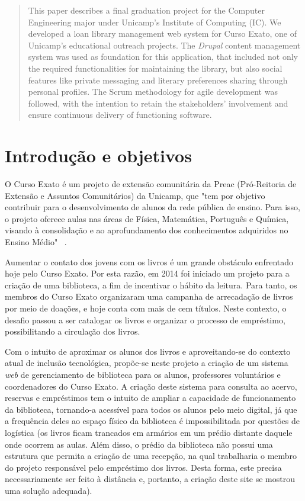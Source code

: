 \documentclass[a4paper]{article}
\begin{document}
\begin{abstract}
\normalsize
This paper describes a final graduation project for the Computer Engineering major under Unicamp's Institute of Computing (IC). We developed a loan library management web system for Curso Exato, one of Unicamp's educational outreach projects. The \textit{Drupal} content management system was used as foundation for this application, that included not only the required functionalities for maintaining the library, but also social features like private messaging and literary preferences sharing through personal profiles. The Scrum methodology for agile development was followed, with the intention to retain the stakeholders' involvement and ensure continuous delivery of functioning software.
\end{abstract}

\pagebreak
\tableofcontents{}

\pagebreak
\clearpage
{}
\setcounter{page}{1}
\section{Introdução e objetivos}

O Curso Exato é um projeto de extensão comunitária da Preac (Pró-Reitoria de Extensão e Assuntos Comunitários) da Unicamp, que "tem por objetivo contribuir para o desenvolvimento de alunos da rede pública de ensino. Para isso, o projeto oferece aulas nas áreas de Física, Matemática, Português e Química, visando à consolidação e ao aprofundamento dos conhecimentos adquiridos no Ensino Médio" \ \cite{cursoexato}.

Aumentar o contato dos jovens com os livros é um grande obstáculo enfrentado hoje pelo Curso Exato. Por esta razão, em 2014 foi iniciado um projeto para a criação de uma biblioteca, a fim de incentivar o hábito da leitura. Para tanto, os membros do Curso Exato organizaram uma campanha de arrecadação de livros por meio de doações, e hoje conta com mais de cem títulos. Neste contexto, o desafio passou a ser catalogar os livros e organizar o processo de empréstimo, possibilitando a circulação dos livros.

Com o intuito de aproximar os alunos dos livros e aproveitando-se do contexto atual de inclusão tecnológica, propõe-se neste projeto a criação de um sistema \textit{web} de gerenciamento de biblioteca para os alunos, professores voluntários e coordenadores do Curso Exato. A criação deste sistema para consulta ao acervo, reservas e empréstimos tem o intuito de ampliar a capacidade de funcionamento da biblioteca, tornando-a acessível para todos os alunos pelo meio digital, já que a frequência deles ao espaço físico da biblioteca é impossibilitada por questões de logística (os livros ficam trancados em armários em um prédio distante daquele onde ocorrem as aulas. Além disso, o prédio da biblioteca não possui uma estrutura que permita a criação de uma recepção, na qual trabalharia o membro do projeto responsável pelo empréstimo dos livros. Desta forma, este precisa necessariamente ser feito à distância e, portanto, a criação deste site se mostrou uma solução adequada).
\end{document}
